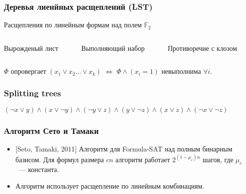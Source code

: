 
\begin{frame}
    \frametitle{Деревья лиенйных расщеплений (LST)}
	Расщепления по линейным формам над полем $\mathbb{F}_2$
    \begin{columns}
        \begin{column}{3cm}
            Вырожденый лист
            
        \end{column}
        \begin{column}{3cm}
            Выполняющий набор
            
        \end{column}
        \begin{column}{3cm}
            Противоречие с клозом
            
        \end{column}
    \end{columns}
    
	$\Phi$ опровергает $(x_1 \lor x_2 \dots \lor x_k)$ $\Leftrightarrow$ $\Phi \land (x_i = 1)$ невыполнима $\forall i$.
\end{frame}

\begin{frame}
    \frametitle{Splitting trees}
    $(\lnot x \lor y) \land (x \lor \lnot y) \land (\lnot y \lor z) \land
    	(y \lor \lnot z) \land (x \lor z) \land (\lnot x \lor \lnot z)$ 
	\only<1>{}
	\only<2>{}
\end{frame}


\begin{frame}
    \frametitle{Алгоритм Сето и Тамаки}

	\begin{itemize}
		\item{} [Seto, Tamaki, 2011] Алгоритм для Formula-SAT над полным бинарным базисом. Для формул размера $cn$ алгоритм
		    работает $2^{(1 - \mu_c)n}$ шагов, где $\mu_c$~--- константа.
        \pause
		\item Алгоритм использует расщепление по линейным комбинациям.
	\end{itemize}    
\end{frame}


